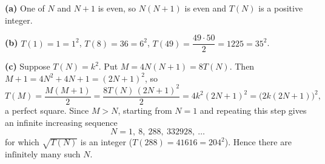 \textbf{(a)} One of $N$ and $N+1$ is even, so $N(N+1)$ is even and $T(N)$ is a positive integer.

\textbf{(b)} $T(1)=1=1^2$, $T(8)=36=6^2$, $T(49)=\dfrac{49\cdot50}{2}=1225=35^2$.

\textbf{(c)} Suppose $T(N)=k^2$. Put $M=4N(N+1)=8T(N)$. Then $M+1=4N^2+4N+1=(2N+1)^2$, so
\[
T(M)=\dfrac{M(M+1)}{2}=\dfrac{8T(N)\,(2N+1)^2}{2}=4k^2(2N+1)^2=\bigl(2k(2N+1)\bigr)^2 ,
\]
a perfect square. Since $M>N$, starting from $N=1$ and repeating this step gives an infinite increasing sequence
\[
N=1,\ 8,\ 288,\ 332928,\ \dots
\]
for which $\sqrt{T(N)}$ is an integer ($T(288)=41616=204^2$). Hence there are $\boxed{\text{infinitely many}}$ such $N$.
